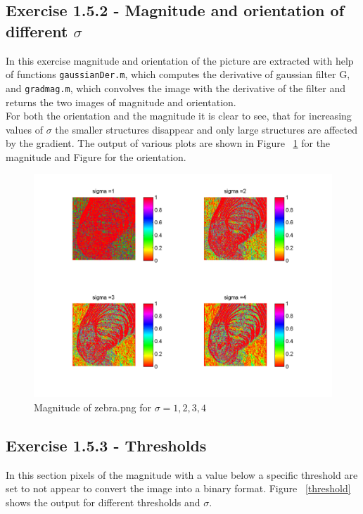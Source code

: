 \documentclass[11pt]{article}
\begin{document}
\subsection{Exercise 1.5.2 - Magnitude and orientation of different $\sigma$}
In this exercise magnitude and orientation of the picture are extracted with help of functions \texttt{gaussianDer.m}, which computes the derivative of gaussian filter G, and \texttt{gradmag.m}, which convolves the image with the derivative of the filter and returns the two images of magnitude and orientation.\\
For both the orientation and the magnitude it is clear to see, that for increasing values of $\sigma$ the smaller structures disappear and only large structures are affected by the gradient. The output of various plots are shown in Figure ~\ref{magnitude} for the magnitude and Figure for the orientation.
\begin{figure}[h!]
\includegraphics[scale=0.6]{magnitude.png}
\caption{Magnitude of zebra.png for $\sigma = {1,2,3,4}$}
\label{magnitude}
\end{figure}

\subsection{Exercise 1.5.3 - Thresholds}
In this section pixels of the magnitude with a value below a specific threshold are set to not appear to convert the image into a binary format. Figure ~\ref{threshold} shows the output for different thresholds and $\sigma$.
\end{document}
